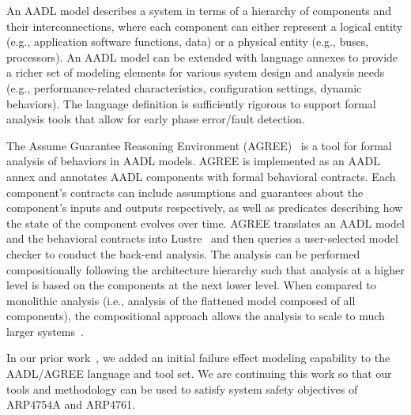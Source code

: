 An AADL model describes a system in terms of a hierarchy of components and their interconnections, where each component can either represent a logical entity (e.g., application software functions, data) or a physical entity (e.g., buses, processors). An AADL model can be extended with language annexes to provide a richer set of modeling elements for various system design and analysis needs (e.g., performance-related characteristics, configuration settings, dynamic behaviors). The language definition is sufficiently rigorous to support formal analysis tools that allow for early phase error/fault detection.

The Assume Guarantee Reasoning Environment (AGREE)~\cite{NFM2012:CoGaMiWhLaLu} is a tool for formal analysis of behaviors in AADL models.  AGREE is implemented as an AADL annex and annotates AADL components with formal behavioral contracts. Each component's contracts can include assumptions and guarantees about the component's inputs and outputs respectively, as well as predicates describing how the state of the component evolves over time. AGREE translates an AADL model and the behavioral contracts into Lustre~\cite{Halbwachs91:IEEE} and then queries a user-selected
model checker to conduct the back-end analysis. The analysis %
can be performed compositionally following the architecture hierarchy such that analysis at a higher level is based on the components at the next lower level.  When compared to monolithic analysis (i.e., analysis of the flattened model composed of all components), the compositional approach allows the analysis to scale to much larger systems~\cite{NFM2012:CoGaMiWhLaLu}. 


In our prior work~\cite{Stewart17:IMBSA}, we added an initial failure effect modeling capability to the AADL/AGREE language and tool set.  We are continuing this work so that our tools and methodology can be used to satisfy system safety objectives of ARP4754A and ARP4761.  

